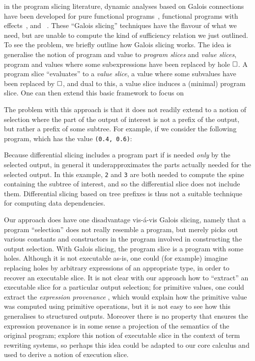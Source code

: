 in the program slicing literature, dynamic analyses based on Galois connections have been developed for pure functional programs~\cite{perera12a}, functional programs with effects~\cite{ricciotti17}, and \piCalculus~\cite{perera16d}. These ``Galois slicing'' techniques have the flavour of what we need, but are unable to compute the kind of sufficiency relation we just outlined. To see the problem, we briefly outline how Galois slicing works. The idea is generalise the notion of program and value to \emph{program slices} and \emph{value slices}, program and values where some subexpressions have been replaced by hole $\square$. A program slice ``evaluates'' to a \emph{value slice}, a value where some subvalues have been replaced by $\square$, and dual to this, a value slice induces a (minimal) program slice. One can then extend this basic framework to focus on

The problem with this approach is that it does not readily extend to a notion of selection where the part of the output of interest is not a prefix of the output, but rather a prefix of some subtree. For example, if we consider the following program, which has the value \lstinline{(0.4, 0.6)}:



\noindent Because differential slicing includes a program part if is needed \emph{only} by the selected output, in general it underapproximates the parts actually needed for the selected output. In this example, \lstinline{2} and \lstinline{3} are both needed to compute the spine containing the subtree of interest, and so the differential slice does not include them. Differential slicing based on tree prefixes is thus not a suitable technique for computing data dependencies.

Our approach does have one disadvantage vis-\'a-vis Galois slicing, namely that a program ``selection'' does not really resemble a program, but merely picks out various constants and constructors in the program involved in constructing the output selection. With Galois slicing, the program slice is a program with some holes. Although it is not executable as-is, one could (for example) imagine replacing holes by arbitrary expressions of an appropriate type, in order to recover an executable slice. It is not clear with our approach how to ``extract'' an executable slice for a particular output selection; for primitive values, one could extract the \emph{expression provenance} \cite{acar12}, which would explain how the primitive value was computed using primitive operations, but it is not easy to see how this generalises to structured outputs. Moreover there is no property that ensures the expression provenance is in some sense a projection of the semantics of the original program; \cite{field98} explore this notion of executable slice in the context of term rewriting systems, so perhaps this idea could be adapted to our core calculus and used to derive a notion of execution slice. 
